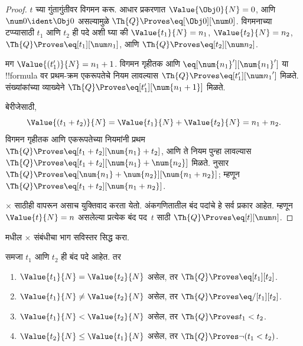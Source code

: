 \documentclass[../../../include/open-logic-section]{subfiles}
\begin{document}
\begin{proof}
$t$ च्या गुंतागुंतीवर विगमन करू. आधार प्रकरणात
$\Value{\Obj 0}{N} = 0$, आणि
$\num 0 \ident \Obj 0$ असल्यामुळे
$\Th{Q} \Proves \eq[\Obj 0][\num 0]$.
%
विगमनाच्या टप्प्यासाठी $t_1$ आणि $t_2$ ही पदे अशी घ्या की
$\Value{t_1}{N} = n_1$, $\Value{t_2}{N} = n_2$,
$\Th{Q} \Proves \eq[t_1][\num n_1]$, आणि
$\Th{Q} \Proves \eq[t_2][\num n_2]$.

मग $\Value{(t_1')}{N} = n_1 + 1$. विगमन गृहीतक आणि
$\eq[\num{n_1}'][\num{n_1}']$ या !!{formula} वर
प्रथम-क्रम एकरूपतेचे नियम लावल्यास
$\Th{Q} \Proves \eq[t_1'][{\num n_1}']$ मिळते.
संख्यांकांच्या व्याख्येने
$\Th{Q} \Proves \eq[t_1'][\num{n_1 + 1}]$ मिळते.

बेरीजेसाठी,
\[
      \Value{(t_1 + t_2)}{N}
    = \Value{t_1}{N} + \Value{t_2}{N}
    = n_1 + n_2.
\]
विगमन गृहीतक आणि एकरूपतेच्या नियमांनी प्रथम
$\Th{Q} \Proves \eq[t_1 + t_2][\num{n_1} + t_2]$,
आणि ते नियम पुन्हा लावल्यास
$\Th{Q} \Proves \eq[t_1 + t_2][\num{n_1} + \num{n_2}]$
मिळते.  नुसार
$\Th{Q} \Proves \eq[\num{n_1} + \num{n_2}][\num{n_1 + n_2}]$;
म्हणून $\Th{Q} \Proves \eq[t_1 + t_2][\num{n_1 + n_2}]$.

$\times$ साठीही
 वापरून असाच
युक्तिवाद करता येतो.
%
अंकगणितातील बंद पदांचे हे सर्व प्रकार आहेत. म्हणून
$\Value{t}{N} = n$ असलेल्या प्रत्येक बंद पद~$t$ साठी
$\Th{Q} \Proves \eq[t][\num n]$.
\end{proof}

\begin{prob}
 मधील $\times$ संबंधीचा
भाग सविस्तर सिद्ध करा.
\end{prob}

\begin{lem}
समजा $t_1$ आणि $t_2$ ही बंद पदे आहेत. तर
\begin{enumerate}
\item $\Value{t_1}{N} = \Value{t_2}{N}$ असेल, तर
    $\Th{Q} \Proves \eq[t_1][t_2]$.
\item $\Value{t_1}{N} \neq \Value{t_2}{N}$ असेल, तर
    $\Th{Q} \Proves \eq/[t_1][t_2]$.
\item $\Value{t_1}{N} < \Value{t_2}{N}$ असेल, तर
    $\Th{Q} \Proves t_1 < t_2$.
\item $\Value{t_2}{N} \leq \Value{t_1}{N}$ असेल, तर
    $\Th{Q} \Proves \lnot(t_1 < t_2)$.
\end{enumerate}
\end{lem}
\end{document}

